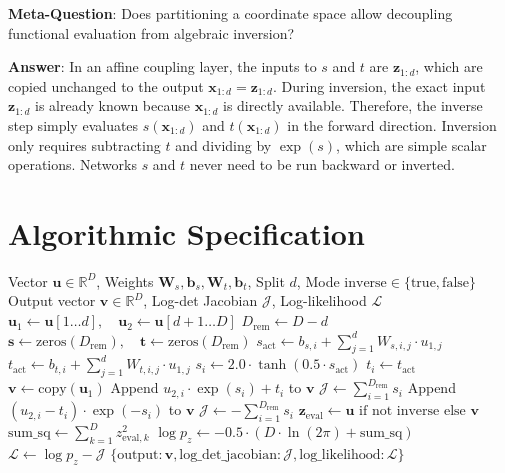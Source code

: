 \documentclass[11pt,a4paper]{article}
\theoremstyle{definition}
\begin{document}
\textbf{Meta-Question}: Does partitioning a coordinate space allow decoupling functional evaluation from algebraic inversion?

\textbf{Answer}: In an affine coupling layer, the inputs to $s$ and $t$ are $\mathbf{z}_{1:d}$, which are copied unchanged to the output $\mathbf{x}_{1:d} = \mathbf{z}_{1:d}$. During inversion, the exact input $\mathbf{z}_{1:d}$ is already known because $\mathbf{x}_{1:d}$ is directly available. Therefore, the inverse step simply evaluates $s(\mathbf{x}_{1:d})$ and $t(\mathbf{x}_{1:d})$ in the forward direction. Inversion only requires subtracting $t$ and dividing by $\exp(s)$, which are simple scalar operations. Networks $s$ and $t$ never need to be run backward or inverted.

\section{Algorithmic Specification}

\begin{algorithm}[H]
\caption{Affine Coupling Normalizing Flow Forward and Inverse Evaluation}
\label{alg:norm_flow}
\begin{algorithmic}[1]
\Require Vector $\mathbf{u} \in \mathbb{R}^D$, Weights $\mathbf{W}_s, \mathbf{b}_s, \mathbf{W}_t, \mathbf{b}_t$, Split $d$, Mode $\text{inverse} \in \{\text{true}, \text{false}\}$
\Ensure Output vector $\mathbf{v} \in \mathbb{R}^D$, Log-det Jacobian $\mathcal{J}$, Log-likelihood $\mathcal{L}$
\State $\mathbf{u}_1 \gets \mathbf{u}[1 \dots d], \quad \mathbf{u}_2 \gets \mathbf{u}[d+1 \dots D]$
\State $D_{\text{rem}} \gets D - d$
\State $\mathbf{s} \gets \text{zeros}(D_{\text{rem}}), \quad \mathbf{t} \gets \text{zeros}(D_{\text{rem}})$
    \State $s_{\text{act}} \gets b_{s, i} + \sum_{j=1}^d W_{s, i, j} \cdot u_{1, j}$
    \State $t_{\text{act}} \gets b_{t, i} + \sum_{j=1}^d W_{t, i, j} \cdot u_{1, j}$
    \State $s_i \gets 2.0 \cdot \tanh(0.5 \cdot s_{\text{act}})$ 
    \State $t_i \gets t_{\text{act}}$
\EndFor
\State $\mathbf{v} \gets \text{copy}(\mathbf{u}_1)$
        \State Append $u_{2, i} \cdot \exp(s_i) + t_i$ to $\mathbf{v}$
    \EndFor
    \State $\mathcal{J} \gets \sum_{i=1}^{D_{\text{rem}}} s_i$
\Else
        \State Append $(u_{2, i} - t_i) \cdot \exp(-s_i)$ to $\mathbf{v}$
    \EndFor
    \State $\mathcal{J} \gets -\sum_{i=1}^{D_{\text{rem}}} s_i$
\EndIf
\State $\mathbf{z}_{\text{eval}} \gets \mathbf{u} \text{ if not inverse else } \mathbf{v}$
\State $\text{sum\_sq} \gets \sum_{k=1}^D z_{\text{eval}, k}^2$
\State $\log p_z \gets -0.5 \cdot (D \cdot \ln(2\pi) + \text{sum\_sq})$
\State $\mathcal{L} \gets \log p_z - \mathcal{J}$
\State \Return $\{\text{output}: \mathbf{v}, \text{log\_det\_jacobian}: \mathcal{J}, \text{log\_likelihood}: \mathcal{L}\}$
\end{algorithmic}
\end{algorithm}
\end{document}
